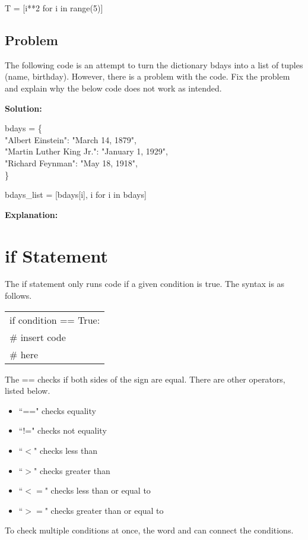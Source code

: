 \documentclass{article}
\newcommand{\define}[1]{\begin{center}\ttfamily #1\end{center}}
\newcommand{\icode}[1]{{\ttfamily #1}}
\newenvironment{code}{\begin{tcolorbox}\ttfamily}{\end{tcolorbox}}
\newenvironment{words}{\begin{tcolorbox}[colback=writing]\ttfamily}{\end{tcolorbox}}
\begin{document}
\define{T = [i**2 for i in range(5)]}

\subsection{Problem}
The following code is an attempt to turn the dictionary \icode{bdays} into a list of tuples \icode{(name, birthday)}. However, there is a problem with the code. Fix the problem and explain why the below code does not work as intended.

\noindent\textbf{Solution:}
\begin{code}
	bdays = \{\\
	\phantom{i}\hspace{2 em}"Albert Einstein": "March 14, 1879",\\
	\phantom{i}\hspace{2 em}"Martin Luther King Jr.": "January 1, 1929",\\
	\phantom{i}\hspace{2 em}"Richard Feynman": "May 18, 1918",\\
	\}
	
	bdays\_list = [bdays[i], i for i in bdays]\\
\end{code}
\noindent\textbf{Explanation:}
\begin{words}
	\vspace{1.2 cm}
\end{words}

\section{\icode{if} Statement}
The \icode{if} statement only runs code if a given condition is true. The syntax is as follows.

\begin{center} \ttfamily
	\begin{tabular}{|l}
		if condition == True:\\
		\hspace{2 em}\# insert code\\
		\hspace{2 em}\# here
	\end{tabular}
\end{center}
The \icode{==} checks if both sides of the sign are equal. There are other operators, listed below.

\begin{multicols}{2}
	\begin{itemize}
		\item ``==" checks equality
		\item ``!=" checks not equality
		\item ``$<$" checks less than
		\item ``$>$" checks greater than
		\item ``$<=$" checks less than or equal to
		\item ``$>=$" checks greater than or equal to
	\end{itemize}
\end{multicols}
\noindent To check multiple conditions at once, the word \icode{and} can connect the conditions.
\end{document}
